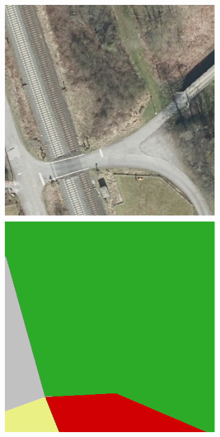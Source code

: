 \begin{figure}[h]
\begin{subfigure}{0.22\textwidth}
        \caption{}
        \label{fig:label_considerations_b}
    \end{subfigure}
    \hfill
    \begin{subfigure}{0.22\textwidth}
        \includegraphics[width=\textwidth]{images/consideration_labels/69493}

\end{subfigure}
\end{figure}
